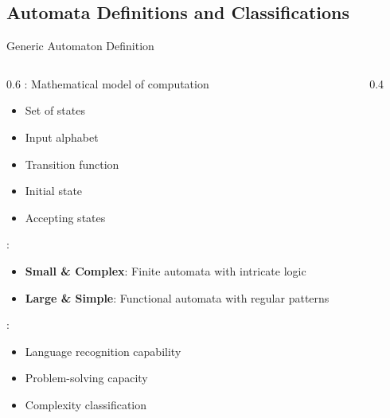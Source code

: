 \subsection{Automata Definitions and Classifications}
\begin{frame}{Generic Automaton Definition}
\begin{columns}
\begin{column}{0.6\textwidth}
: Mathematical model of computation
\begin{itemize}
\item Set of states
\item Input alphabet
\item Transition function
\item Initial state
\item Accepting states
\end{itemize}
\vspace{0.3cm}
:
\begin{itemize}
\item \textbf{Small \& Complex}: Finite automata with intricate logic
\item \textbf{Large \& Simple}: Functional automata with regular patterns
\end{itemize}
\vspace{0.3cm}
:
\begin{itemize}
\item Language recognition capability
\item Problem-solving capacity
\item Complexity classification
\end{itemize}
\end{column}
\begin{column}{0.4\textwidth}
\begin{center}

\end{center}
\end{column}
\end{columns}
\end{frame}

